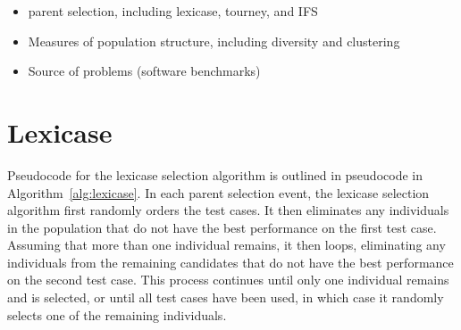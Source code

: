\begin{itemize}
\item parent selection, including lexicase, tourney, and IFS

\item Measures of population structure, including diversity and clustering

\item Source of problems (software benchmarks)

\end{itemize}


\section{Lexicase}

	
Pseudocode for the lexicase selection algorithm is outlined in pseudocode in 
Algorithm~\ref{alg:lexicase}. In each parent selection event, the lexicase selection algorithm 
first randomly orders the test cases. It then eliminates any individuals in the population 
that do not have the best performance on the first test case. 
Assuming that more than one individual remains, it then loops, eliminating any individuals from 
the remaining candidates that do not have the best performance on the second test case. This 
process continues until only one individual remains and is selected, or until all test cases 
have been used, in which case it randomly selects one of the remaining individuals.

